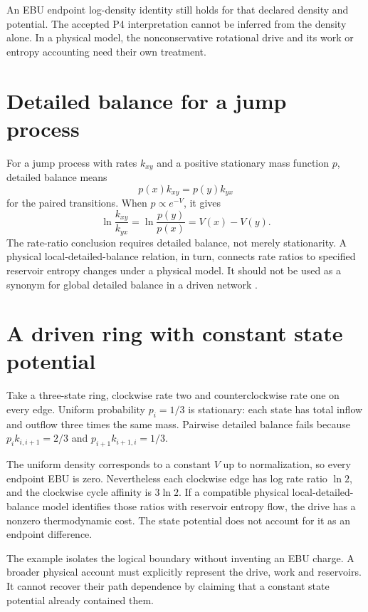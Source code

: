 An EBU endpoint log-density identity still holds for that declared density and potential. The accepted P4 interpretation cannot be inferred from the density alone. In a physical model, the nonconservative rotational drive and its work or entropy accounting need their own treatment.

\section{Detailed balance for a jump process}
For a jump process with rates $k_{xy}$ and a positive stationary mass function $p$, detailed balance means
\begin{equation}
 p(x)k_{xy}=p(y)k_{yx}
\end{equation}
for the paired transitions. When $p\propto e^{-V}$, it gives
\begin{equation}
 \ln\frac{k_{xy}}{k_{yx}}=\ln\frac{p(y)}{p(x)}=V(x)-V(y).
\end{equation}
The rate-ratio conclusion requires detailed balance, not merely stationarity. A physical local-detailed-balance relation, in turn, connects rate ratios to specified reservoir entropy changes under a physical model. It should not be used as a synonym for global detailed balance in a driven network \cite{maes,seifert}.

\section{A driven ring with constant state potential}
Take a three-state ring, clockwise rate two and counterclockwise rate one on every edge. Uniform probability $p_i=1/3$ is stationary: each state has total inflow and outflow three times the same mass. Pairwise detailed balance fails because $p_i k_{i,i+1}=2/3$ and $p_{i+1}k_{i+1,i}=1/3$.

The uniform density corresponds to a constant $V$ up to normalization, so every endpoint EBU is zero. Nevertheless each clockwise edge has log rate ratio $\ln2$, and the clockwise cycle affinity is $3\ln2$. If a compatible physical local-detailed-balance model identifies those ratios with reservoir entropy flow, the drive has a nonzero thermodynamic cost. The state potential does not account for it as an endpoint difference.

The example isolates the logical boundary without inventing an EBU charge. A broader physical account must explicitly represent the drive, work and reservoirs. It cannot recover their path dependence by claiming that a constant state potential already contained them.

